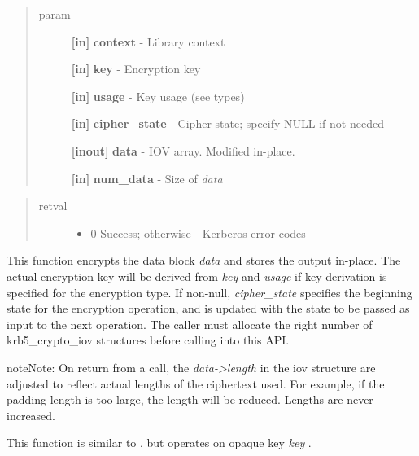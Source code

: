 \documentclass[letterpaper,10pt,english]{sphinxmanual}
\begin{document}
\begin{quote}\begin{description}
\item[{param}] \leavevmode
\textbf{{[}in{]}} \textbf{context} - Library context

\textbf{{[}in{]}} \textbf{key} - Encryption key

\textbf{{[}in{]}} \textbf{usage} - Key usage (see  types)

\textbf{{[}in{]}} \textbf{cipher\_state} - Cipher state; specify NULL if not needed

\textbf{{[}inout{]}} \textbf{data} - IOV array. Modified in-place.

\textbf{{[}in{]}} \textbf{num\_data} - Size of \emph{data}

\end{description}\end{quote}
\begin{quote}\begin{description}
\item[{retval}] \leavevmode\begin{itemize}
\item {} 
0   Success; otherwise - Kerberos error codes

\end{itemize}

\end{description}\end{quote}

This function encrypts the data block \emph{data} and stores the output in-place. The actual encryption key will be derived from \emph{key} and \emph{usage} if key derivation is specified for the encryption type. If non-null, \emph{cipher\_state} specifies the beginning state for the encryption operation, and is updated with the state to be passed as input to the next operation. The caller must allocate the right number of krb5\_crypto\_iov structures before calling into this API.




{\hyperref[appdev/refs/api/krb5_k_decrypt_iov:krb5_k_decrypt_iov]{}}



\begin{notice}{note}{Note:}
On return from a {\hyperref[appdev/refs/api/krb5_c_encrypt_iov:krb5_c_encrypt_iov]{}} call, the \emph{data-\textgreater{}length} in the iov structure are adjusted to reflect actual lengths of the ciphertext used. For example, if the padding length is too large, the length will be reduced. Lengths are never increased.

This function is similar to {\hyperref[appdev/refs/api/krb5_c_encrypt_iov:krb5_c_encrypt_iov]{}} , but operates on opaque key \emph{key} .
\end{notice}
\end{document}
